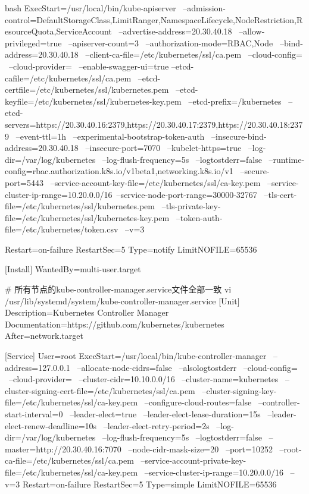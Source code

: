 \begin{outline}[enumerate]
\begin{code-in-enumerate}{bash}
ExecStart=/usr/local/bin/kube-apiserver \
    --admission-control=DefaultStorageClass,LimitRanger,NamespaceLifecycle,NodeRestriction,ResourceQuota,ServiceAccount \
    --advertise-address=20.30.40.18 \
    --allow-privileged=true \
    --apiserver-count=3 \
    --authorization-mode=RBAC,Node \
    --bind-address=20.30.40.18 \
    --client-ca-file=/etc/kubernetes/ssl/ca.pem \
    --cloud-config= \
    --cloud-provider= \
    --enable-swagger-ui=true --etcd-cafile=/etc/kubernetes/ssl/ca.pem \
    --etcd-certfile=/etc/kubernetes/ssl/kubernetes.pem \
    --etcd-keyfile=/etc/kubernetes/ssl/kubernetes-key.pem \
    --etcd-prefix=/kubernetes \
    --etcd-servers=https://20.30.40.16:2379,https://20.30.40.17:2379,https://20.30.40.18:2379 \
    --event-ttl=1h \
    --experimental-bootstrap-token-auth \
    --insecure-bind-address=20.30.40.18 \
    --insecure-port=7070 \
    --kubelet-https=true \
    --log-dir=/var/log/kubernetes \
    --log-flush-frequency=5s \
    --logtostderr=false \
    --runtime-config=rbac.authorization.k8s.io/v1beta1,networking.k8s.io/v1 \
    --secure-port=5443 \
    --service-account-key-file=/etc/kubernetes/ssl/ca-key.pem \
    --service-cluster-ip-range=10.20.0.0/16\
    --service-node-port-range=30000-32767 \
    --tls-cert-file=/etc/kubernetes/ssl/kubernetes.pem \
    --tls-private-key-file=/etc/kubernetes/ssl/kubernetes-key.pem \
    --token-auth-file=/etc/kubernetes/token.csv \
    --v=3

Restart=on-failure
RestartSec=5
Type=notify
LimitNOFILE=65536

[Install]
WantedBy=multi-user.target

# 所有节点的kube-controller-manager.service文件全部一致
vi /usr/lib/systemd/system/kube-controller-manager.service
[Unit]
Description=Kubernetes Controller Manager
Documentation=https://github.com/kubernetes/kubernetes
After=network.target

[Service]
User=root
ExecStart=/usr/local/bin/kube-controller-manager \
    --address=127.0.0.1 \
    --allocate-node-cidrs=false \
    --alsologtostderr \
    --cloud-config= \
    --cloud-provider= \
    --cluster-cidr=10.10.0.0/16 \
    --cluster-name=kubernetes \
    --cluster-signing-cert-file=/etc/kubernetes/ssl/ca.pem \
    --cluster-signing-key-file=/etc/kubernetes/ssl/ca-key.pem \
    --configure-cloud-routes=false \
    --controller-start-interval=0 \
    --leader-elect=true \
    --leader-elect-lease-duration=15s \
    --leader-elect-renew-deadline=10s \
    --leader-elect-retry-period=2s \
    --log-dir=/var/log/kubernetes \
    --log-flush-frequency=5s \
    --logtostderr=false \
    --master=http://20.30.40.16:7070 \
    --node-cidr-mask-size=20 \
    --port=10252 \
    --root-ca-file=/etc/kubernetes/ssl/ca.pem \
    --service-account-private-key-file=/etc/kubernetes/ssl/ca-key.pem \
    --service-cluster-ip-range=10.20.0.0/16 \
    --v=3
Restart=on-failure
RestartSec=5
Type=simple
LimitNOFILE=65536


\end{code-in-enumerate}
\end{outline}
